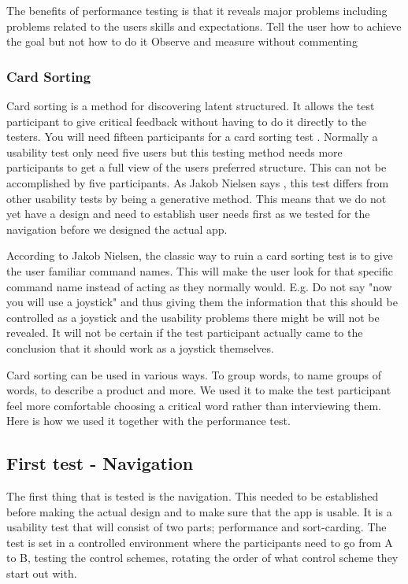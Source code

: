 The benefits of performance testing is that it reveals major problems including problems related to the users skills and expectations. \cite{performance}
Tell the user how to achieve the goal but not how to do it \cite{} 
Observe and measure without commenting\cite{}

\subsubsection{Card Sorting}
Card sorting is a method for discovering latent structured. \cite{cards}
It allows the test participant to give critical feedback without having to do it directly to the testers. 
You will need fifteen participants for a card sorting test \cite{cardSorting}. Normally a usability test only need five users but this testing method needs more participants to get a full view of the users preferred structure. This can not be accomplished by five participants. \cite{cardSorting}
As Jakob Nielsen says \cite{cardSorting}, this test differs from other usability tests by being a generative method. This means that we do not yet have a design and need to establish user needs first as we tested for the navigation before we designed the actual app. 

According to Jakob Nielsen, the classic way to ruin a card sorting test is to give the user familiar command names. This will make the user look for that specific command name instead of acting as they normally would.\cite{cardSorting}
E.g. Do not say "now you will use a joystick" and thus giving them the information that this should be controlled as a joystick and the usability problems there might be will not be revealed. It will not be certain if the test participant actually came to the conclusion that it should work as a joystick
themselves. 

Card sorting can be used in various ways. To group words, to name groups of words, to describe a product and more. 
We used it to make the test participant feel more comfortable choosing a critical word rather than interviewing them. 
Here is how we used it together with the performance test.

\subsection{First test - Navigation}

The first thing that is tested is the navigation. This needed to be established before making the actual design and to make sure that the app is usable.
It is a usability test that will consist of two parts; performance and sort-carding. 
The test is set in a controlled environment where the participants need to go from A to B, testing the control schemes, rotating the order of what control scheme they start out with.

